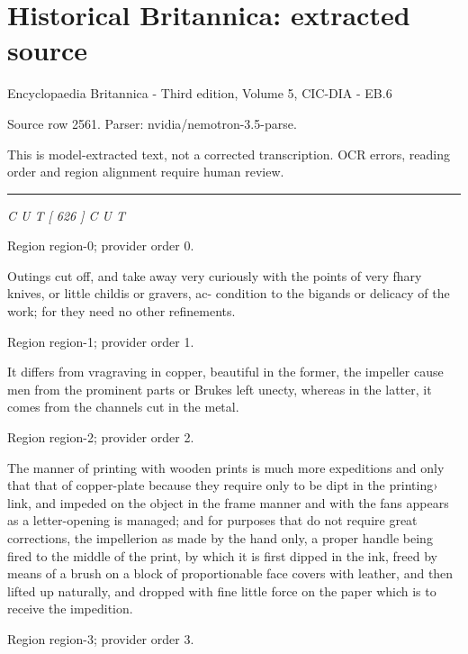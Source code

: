 \documentclass[11pt]{article}
\begin{document}
\section*{Historical Britannica: extracted source}
Encyclopaedia Britannica - Third edition, Volume 5, CIC-DIA - EB.6\par
{\small Source row 2561. Parser: nvidia/nemotron-3.5-parse.\par}
{\small This is model-extracted text, not a corrected transcription. OCR errors, reading order and region alignment require human review.\par}
\hrule\medskip
{\small\itshape C U T [ 626 ] C U T\par}

{\scriptsize\color{gray} Region region-0; provider order 0.\par}
\medskip

Outings cut off, and take away very curiously with the points of very fhary knives, or little childis or gravers, ac- condition to the bigands or delicacy of the work; for they need no other refinements.
\par

{\scriptsize\color{gray} Region region-1; provider order 1.\par}
\medskip

It differs from vragraving in copper, beautiful in the former, the impeller cause men from the prominent parts or Brukes left unecty, whereas in the latter, it comes from the channels cut in the metal.
\par

{\scriptsize\color{gray} Region region-2; provider order 2.\par}
\medskip

The manner of printing with wooden prints is much more expeditions and only that that of copper-plate because they require only to be dipt in the printing› link, and impeded on the object in the frame manner and with the fans appears as a letter-opening is managed; and for purposes that do not require great corrections, the impellerion as made by the hand only, a proper handle being fired to the middle of the print, by which it is first dipped in the ink, freed by means of a brush on a block of proportionable face covers with leather, and then lifted up naturally, and dropped with fine little force on the paper which is to receive the impedition.
\par

{\scriptsize\color{gray} Region region-3; provider order 3.\par}
\medskip
\end{document}
